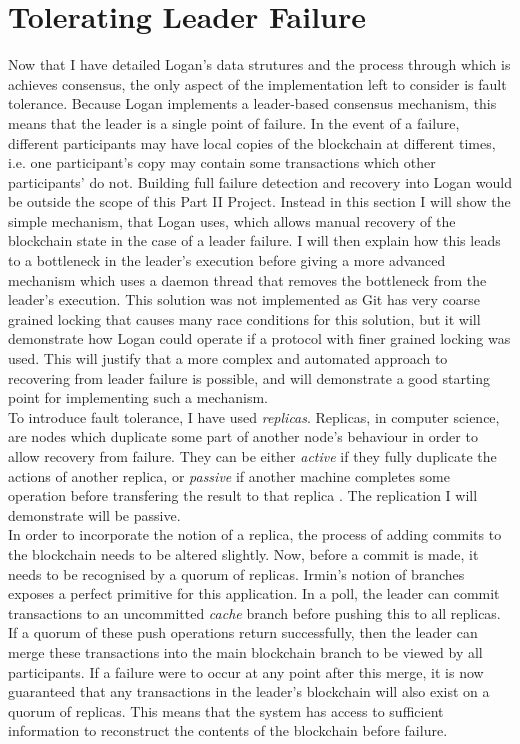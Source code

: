 \documentclass[12pt,a4paper,twoside,openright]{report}
\begin{document}
	\section{Tolerating Leader Failure}\label{sec:faulttol}
	Now that I have detailed Logan's data strutures and the process through which is achieves consensus, the only aspect of the implementation left to consider is fault tolerance.
	Because Logan implements a leader-based consensus mechanism, this means that the leader is a single point of failure.
	In the event of a failure, different participants may have local copies of the blockchain at different times, i.e. one participant's copy may contain some transactions which other participants' do not.
	Building full failure detection and recovery into Logan would be outside the scope of this Part II Project. 
	Instead in this section I will show the simple mechanism, that Logan uses, which allows manual recovery of the blockchain state in the case of a leader failure. 
	I will then explain how this leads to a bottleneck in the leader's execution before giving a more advanced mechanism which uses a daemon thread that removes the bottleneck from the leader's execution. 
	This solution was not implemented as Git has very coarse grained locking that causes many race conditions for this solution, but it will demonstrate how Logan could operate if a protocol with finer grained locking was used. 
	This will justify that a more complex and automated approach to recovering from leader failure is possible, and will demonstrate a good starting point for implementing such a mechanism. \\

	To introduce fault tolerance, I have used \textit{replicas}. 
	Replicas, in computer science, are nodes which duplicate some part of another node's behaviour in order to allow recovery from failure. 
	They can be either \textit{active} if they fully duplicate the actions of another replica, or \textit{passive} if another machine completes some operation before transfering the result to that replica \parencite{Replication}.
	The replication I will demonstrate will be passive.\\

	In order to incorporate the notion of a replica, the process of adding commits to the blockchain needs to be altered slightly.
	Now, before a commit is made, it needs to be recognised by a quorum of replicas.
	Irmin's notion of branches exposes a perfect primitive for this application.
	In a poll, the leader can commit transactions to an uncommitted \textit{cache} branch before pushing this to all replicas.
	If a quorum of these push operations return successfully, then the leader can merge these transactions into the main blockchain branch to be viewed by all participants.
	If a failure were to occur at any point after this merge, it is now guaranteed that any transactions in the leader's blockchain will also exist on a quorum of replicas.
	This means that the system has access to sufficient information to reconstruct the contents of the blockchain before failure.\\
\end{document}
